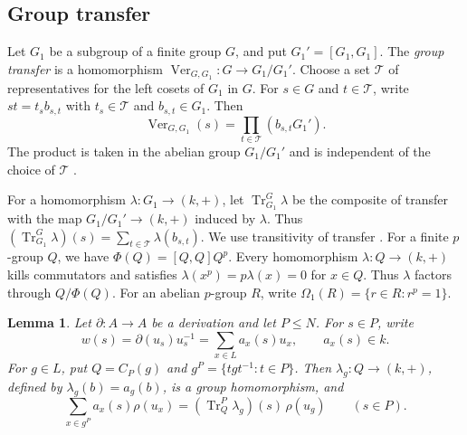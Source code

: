 \documentclass[11pt,a4paper]{article}
\newtheorem{lemma}[theorem]{Lemma}
\theoremstyle{definition}
\theoremstyle{remark}
\numberwithin{equation}{section}
\begin{document}
	\subsection{Group transfer}
	
	Let $G_1$ be a subgroup of a finite group $G$, and put $G_1'=[G_1,G_1]$.
	The \emph{group transfer} is a homomorphism
	$\operatorname{Ver}_{G,G_1}:G\to G_1/G_1'$.
	Choose a set $\mathcal T$ of representatives for the left cosets of $G_1$ in $G$.
	For $s\in G$ and $t\in\mathcal T$, write $st=t_s b_{s,t}$ with
	$t_s\in\mathcal T$ and $b_{s,t}\in G_1$. Then
	\[
	\operatorname{Ver}_{G,G_1}(s)=\prod_{t\in\mathcal T}(b_{s,t}G_1').
	\]
	The product is taken in the abelian group $G_1/G_1'$ and is independent
	of the choice of $\mathcal T$ \cite[Theorems~5.1 and~5.2]{Isaacs2008}.
	
	For a homomorphism $\lambda:G_1\to(k,+)$, let $\operatorname{Tr}_{G_1}^G\lambda$
	be the composite of transfer with the map $G_1/G_1'\to(k,+)$ induced by
	$\lambda$. Thus $(\operatorname{Tr}_{G_1}^G\lambda)(s)
	=\sum_{t\in\mathcal T}\lambda(b_{s,t})$. We use transitivity of transfer
	\cite[Theorem~10.8]{Isaacs2008}. For a finite $p$-group $Q$, we have
	$\Phi(Q)=[Q,Q]Q^p$. Every homomorphism $\lambda:Q\to(k,+)$ kills
	commutators and satisfies $\lambda(x^p)=p\lambda(x)=0$ for $x\in Q$.
	Thus $\lambda$ factors through $Q/\Phi(Q)$.
	For an abelian $p$-group $R$, write $\Omega_1(R)=\{r\in R:r^p=1\}$.
	
	\begin{lemma}\label{lem:orbit-sum}
		Let $\partial:A\to A$ be a derivation and let $P\le N$. For $s\in P$, write
		\[
		w(s)=\partial(u_s)u_s^{-1}=\sum_{x\in L}a_x(s)u_x,\qquad a_x(s)\in k.
		\]
		For $g\in L$, put $Q=C_P(g)$ and $g^P=\{tgt^{-1}:t\in P\}$.
		Then $\lambda_g:Q\to(k,+)$, defined by $\lambda_g(b)=a_g(b)$,
		is a group homomorphism, and
		\[
		\sum_{x\in g^P} a_x(s)\rho(u_x)
		=
		(\operatorname{Tr}_{Q}^{P}\lambda_g)(s)\,\rho(u_g)
		\qquad(s\in P).
		\]
	\end{lemma}
	
\end{document}
